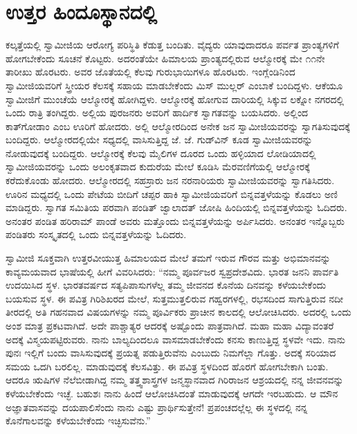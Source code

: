 
\chapter{ಉತ್ತರ ಹಿಂದೂಸ್ಥಾನದಲ್ಲಿ}

 ಕಲ್ಕತ್ತೆಯಲ್ಲಿ ಸ್ವಾಮೀಜಿಯ ಆರೋಗ್ಯ ಪರಿಸ್ಥಿತಿ ಕೆಡುತ್ತ ಬಂದಿತು. ವೈದ್ಯರು ಯಾವುದಾದರೂ ಪರ್ವತ ಪ್ರಾಂತ್ಯಗಳಿಗೆ ಹೋಗಬೇಕೆಂದು ಸೂಚನೆ ಕೊಟ್ಟರು. ಅದರಂತೆಯೇ ಹಿಮಾಲಯ ಪ್ರಾಂತ್ಯದಲ್ಲಿರುವ ಆಲ್ಮೋರಕ್ಕೆ ಮೇ ೧೧ನೇ ತಾರೀಖು ಹೊರಟರು. ಅವರ ಜೊತೆಯಲ್ಲಿ ಕೆಲವು ಗುರುಭಾಯಿಗಳೂ ಹೊರಟರು. ಇಂಗ್ಲೆಂಡಿನಿಂದ ಸ್ವಾಮೀಜಿಯವರಿಗೆ ಸ್ತ್ರೀಯರ ಕೆಲಸಕ್ಕೆ ಸಹಾಯ ಮಾಡಬೇಕೆಂದು ಮಿಸ್ ಮುಲ್ಲರ್ ಎಂಬಾಕೆ ಬಂದಿದ್ದಳು. ಆಕೆಯೂ ಸ್ವಾಮೀಜಿಗೆ ಮುಂಚೆಯೆ ಆಲ್ಮೋರಕ್ಕೆ ಹೋಗಿದ್ದಳು. ಆಲ್ಮೋರಕ್ಕೆ ಹೋಗುವ ದಾರಿಯಲ್ಲಿ ಸಿಕ್ಕುವ ಲಕ್ನೋ ನಗರದಲ್ಲಿ ಒಂದು ರಾತ್ರಿ ತಂಗಿದ್ದರು. ಅಲ್ಲಿಯ ಪುರಜನರು ಅವರಿಗೆ ಹಾರ್ದಿಕ ಸ್ವಾಗತವನ್ನು ಬಯಸಿದರು. ಅಲ್ಲಿಂದ ಕಾತ್‍ಗೋಡಾಂ ಎಂಬ ಊರಿಗೆ ಹೋದರು. ಅಲ್ಲಿ ಆಲ್ಮೋರದಿಂದ ಅನೇಕ ಜನ ಸ್ವಾಮೀಜಿಯವರನ್ನು ಸ್ವಾಗತಿಸುವುದಕ್ಕೆ ಬಂದಿದ್ದರು. ಆಲ್ಮೋರದಲ್ಲಿಯೇ ಸಧ್ಯದಲ್ಲಿ ವಾಸಿಸುತ್ತಿದ್ದ ಜೆ. ಜೆ. ಗುಡ್‍ವಿನ್ ಕೂಡ ಸ್ವಾಮೀಜಿಯವರನ್ನು ನೋಡುವುದಕ್ಕೆ ಬಂದಿದ್ದರು. ಆಲ್ಮೋರಕ್ಕೆ ಕೆಲವು ಮೈಲಿಗಳ ದೂರದ ಒಂದು ಹಳ್ಳಿಯಾದ ಲೋಡಿಯಾದಲ್ಲಿ ಸ್ವಾಮೀಜಿಯವರನ್ನು ಒಂದು ಅಲಂಕೃತವಾದ ಕುದುರೆಯ ಮೇಲೆ ಕೂಡಿಸಿ ಮೆರವಣಿಗೆಯಲ್ಲಿ ಆಲ್ಮೋರಕ್ಕೆ ಕರೆದುಕೊಂಡು ಹೋದರು. ಆಲ್ಮೋರದಲ್ಲಿ ಸಹಸ್ರಾರು ಜನ ನರನಾರಿಯರು ಸ್ವಾಮೀಜಿಯವರನ್ನು ಸ್ವಾಗತಿಸಿದರು. ಊರಿನ ಮಧ್ಯದಲ್ಲಿ ಒಂದು ಪೇಟೆಯ ಬೀದಿಗೆ ಚಪ್ಪರ ಹಾಕಿ ಸ್ವಾಮೀಜಿಯವರಿಗೆ ಬಿನ್ನವತ್ತಳೆಯನ್ನು ಕೊಡಲು ಅಣಿ ಮಾಡಿದ್ದರು. ಸ್ವಾಗತ ಸಮಿತಿಯ ಪರವಾಗಿ ಪಂಡಿತ್ ಜ್ವಾಲಾದತ್ ಜೋಷಿ ಹಿಂದಿಯಲ್ಲಿ ಬಿನ್ನವತ್ತಳೆಯನ್ನು ಓದಿದರು. ಅನಂತರ ಪಂಡಿತ ಹರಿರಾಮ್ ಪಾಂಡೆ ಅವರು ಮತ್ತೊಂದು ಬಿನ್ನವತ್ತಳೆಯನ್ನು ಅರ್ಪಿಸಿದರು. ಅನಂತರ ಇನ್ನೊಬ್ಬರು ಪಂಡಿತರು ಸಂಸ್ಕೃತದಲ್ಲಿ ಒಂದು ಬಿನ್ನವತ್ತಳೆಯನ್ನು ಓದಿದರು. 

 ಸ್ವಾಮೀಜಿ ಸೂಕ್ತವಾಗಿ ಉತ್ತರವೀಯುತ್ತ ಹಿಮಾಲಯದ ಮೇಲೆ ತಮಗೆ ಇರುವ ಗೌರವ ಮತ್ತು ಅಭಿಮಾನವನ್ನು ಕಾವ್ಯಮಯವಾದ ಭಾಷೆಯಲ್ಲಿ ಹೀಗೆ ವಿವರಿಸಿದರು: “ನಮ್ಮ ಪೂರ್ವಜರ ಸ್ವಪ್ರದೇಶವಿದು. ಭಾರತ ಜನನಿ ಪಾರ್ವತಿ ಉದಯಿಸಿದ ಸ್ಥಳ. ಭಾರತವರ್ಷದ ಸತ್ಯಪಿಪಾಸುಗಳೆಲ್ಲ ತಮ್ಮ ಜೀವನದ ಕೊನೆಯ ದಿನವನ್ನು ಕಳೆಯಬೇಕೆಂದು ಬಯಸುವ ಸ್ಥಳ. ಈ ಪವಿತ್ರ ಗಿರಿಶಿಖರದ ಮೇಲೆ, ಸುತ್ತಮುತ್ತಲಿರುವ ಗಹ್ವರಗಳಲ್ಲಿ, ರಭಸದಿಂದ ಸಾಗುತ್ತಿರುವ ನದೀ ತೀರದಲ್ಲಿ ಅತಿ ಗಹನವಾದ ವಿಷಯಗಳನ್ನು ನಮ್ಮ ಪೂರ್ವಿಕರು ಪ್ರಾಚೀನ ಕಾಲದಲ್ಲಿ ಆಲೋಚಿಸಿದರು. ಅದರಲ್ಲಿ ಒಂದು ಅಂಶ ಮಾತ್ರ ಪ್ರಕಟವಾಗಿದೆ. ಅದೇ ಪಾಶ್ಚಾತ್ಯರ ಆದರಕ್ಕೆ ಅಷ್ಟೊಂದು ಪಾತ್ರವಾಗಿದೆ. ಮಹಾ ಮಹಾ ವಿದ್ಯಾವಂತರೆ ಅದಕ್ಕೆ ವಿಸ್ಮಯಪಟ್ಟಿರುವರು. ನಾನು ಬಾಲ್ಯದಿಂದಲೂ ವಾಸಮಾಡಬೇಕೆಂದು ಕನಸು ಕಾಣುತ್ತಿದ್ದ ಸ್ಥಳವೇ ಇದು. ನಾನು ಪುನಃ ಇಲ್ಲಿಗೆ ಬಂದು ವಾಸಿಸುವುದಕ್ಕೆ ಪ್ರಯತ್ನ ಪಡುತ್ತಿರುವೆನು ಎಂಬುದು ನಿಮಗೆಲ್ಲಾ ಗೊತ್ತು. ಅದಕ್ಕೆ ಸರಿಯಾದ ಸಮಯ ಒದಗಿ ಬರಲಿಲ್ಲ. ಮಾಡುವುದಕ್ಕೆ ಕೆಲಸವಿತ್ತು. ಈ ಪವಿತ್ರ ಸ್ಥಳದಿಂದ ಹೊರಗೆ ಹೋಗಬೇಕಾಗಿ ಬಂತು. ಆದರೂ ಋಷಿಗಳ ನೆಲೆಬೀಡಾಗಿದ್ದ ನಮ್ಮ ತತ್ತ್ವಶಾಸ್ತ್ರಗಳ ಜನ್ಮಸ್ಥಾನವಾದ ಗಿರಿರಾಜನ ಆಶ್ರಯದಲ್ಲಿ ನನ್ನ ಜೀವನವನ್ನು ಕಳೆಯಬೇಕೆಂದು ಇಚ್ಛೆ. ಬಹುಶಃ ನಾನು ಹಿಂದೆ ಆಲೋಚಿಸಿದಂತೆ ಮಾಡುವುದಕ್ಕೆ ಆಗದೇ ಇರಬಹುದು. ಆ ಮೌನ ಅಜ್ಞಾತವಾಸವನ್ನು ದಯಪಾಲಿಸೆಂದು ನಾನು ಎಷ್ಟು ಪ್ರಾರ್ಥಿಸುತ್ತೇನೆ! ಪ್ರಪಂಚದಲ್ಲೆಲ್ಲ ಈ ಸ್ಥಳದಲ್ಲಿ ನನ್ನ ಕೊನೆಗಾಲವನ್ನು ಕಳೆಯಬೇಕೆಂದು ಇಚ್ಛಿಸುವೆನು.” 

